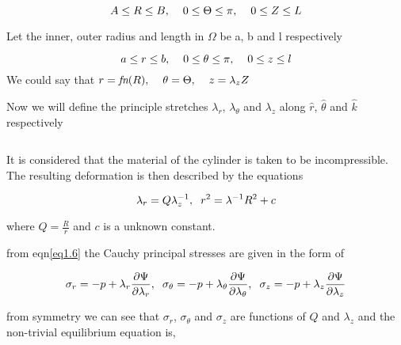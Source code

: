 \documentclass[12pt]{report}
\begin{document}
\[A\leq R \leq B,\hspace{4mm}0\leq \Theta \leq \pi,\hspace{4mm} 0\leq Z \leq L \]
\begin{flushleft}
Let the inner, outer radius and length in $\Omega$ be a, b and l respectively

\[a\leq r \leq b,\hspace{4mm}0\leq \theta \leq \pi,\hspace{4mm} 0\leq z \leq l \]
We could say that  \hspace{23mm}  $r = \textit{fn}(R),\hspace{4mm}\theta=\Theta,\hspace{4mm}z=\lambda_{z}Z  $


Now we will define the principle stretches $\lambda_{r}$, $\lambda_{\theta}$ and $\lambda_{z}$ along $\hat{r}$, $\hat{\theta}$ and $\hat{k}$ respectively 


\begin{equation}\label{eq1.11}
 \end{equation}
 
It is considered that the material of the cylinder is taken to be incompressible. The
resulting deformation is then described by the equations

\begin{equation}\label{eq1.12}
    \lambda_{r} = Q\lambda_{z}^{-1},\hspace{2mm} r^{2}=\lambda^{-1}R^{2}+c
\end{equation}

where $Q = \frac{R}{r}$ and $c$ is a unknown constant.

from eqn\ref{eq1.6} the Cauchy principal stresses are given in the form of

\begin{equation}\label{eq1.13}
    \sigma_{r} = -p + \lambda_{r}\frac{\partial\Psi}{\partial\lambda_{r}},\hspace{2mm}\sigma_{\theta} = -p + \lambda_{\theta}\frac{\partial\Psi}{\partial\lambda_{\theta}},\hspace{2mm}\sigma_{z} = -p + \lambda_{z}\frac{\partial\Psi}{\partial\lambda_{z}}
\end{equation}

from symmetry we can see that $\sigma_{r}$, $\sigma_{\theta}$ and $\sigma_{z}$ are functions of $Q$ and $\lambda_{z}$ and the non-trivial equilibrium equation is,
\vspace{-4mm}


\end{flushleft}
\end{document}
